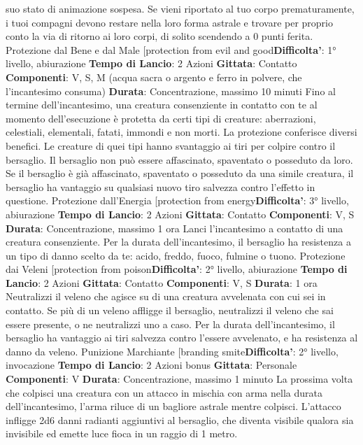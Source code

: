 \begin{multicols}{2}
suo stato di animazione sospesa.
Se vieni riportato al tuo corpo prematuramente, i tuoi
compagni devono restare nella loro forma astrale e
trovare per proprio conto la via di ritorno ai loro corpi, di
solito scendendo a 0 punti ferita.
Protezione dal Bene e dal Male
[protection from evil and good\textbf{Difficolta'}:
1° livello, abiurazione
\textbf{Tempo di Lancio}: 2 Azioni
\textbf{Gittata}: Contatto
\textbf{Componenti}: V, S, M (acqua sacra o argento e ferro in
polvere, che l’incantesimo consuma)
\textbf{Durata}: Concentrazione, massimo 10 minuti
Fino al termine dell’incantesimo, una creatura
consenziente in contatto con te al momento
dell’esecuzione è protetta da certi tipi di creature:
aberrazioni, celestiali, elementali, fatati, immondi e non
morti.
La protezione conferisce diversi benefici. Le creature di
quei tipi hanno svantaggio ai tiri per colpire contro il
bersaglio. Il bersaglio non può essere affascinato,
spaventato o posseduto da loro. Se il bersaglio è già
affascinato, spaventato o posseduto da una simile
creatura, il bersaglio ha vantaggio su qualsiasi nuovo
tiro salvezza contro l’effetto in questione.
Protezione dall’Energia
[protection from energy\textbf{Difficolta'}:
3° livello, abiurazione
\textbf{Tempo di Lancio}: 2 Azioni
\textbf{Gittata}: Contatto
\textbf{Componenti}: V, S
\textbf{Durata}: Concentrazione, massimo 1 ora
Lanci l’incantesimo a contatto di una creatura
consenziente. Per la durata dell’incantesimo, il
bersaglio ha resistenza a un tipo di danno scelto da te:
acido, freddo, fuoco, fulmine o tuono.
Protezione dai Veleni
[protection from poison\textbf{Difficolta'}:
2° livello, abiurazione
\textbf{Tempo di Lancio}: 2 Azioni
\textbf{Gittata}: Contatto
\textbf{Componenti}: V, S
\textbf{Durata}: 1 ora
Neutralizzi il veleno che agisce su di una creatura
avvelenata con cui sei in contatto. Se più di un veleno
affligge il bersaglio, neutralizzi il veleno che sai essere
presente, o ne neutralizzi uno a caso.
Per la durata dell’incantesimo, il bersaglio ha vantaggio
ai tiri salvezza contro l’essere avvelenato, e ha
resistenza al danno da veleno.
Punizione Marchiante
[branding smite\textbf{Difficolta'}:
2° livello, invocazione
\textbf{Tempo di Lancio}: 2 Azioni bonus
\textbf{Gittata}: Personale
\textbf{Componenti}: V
\textbf{Durata}: Concentrazione, massimo 1 minuto
La prossima volta che colpisci una creatura con un
attacco in mischia con arma nella durata
dell’incantesimo, l’arma riluce di un bagliore astrale
mentre colpisci. L’attacco infligge 2d6 danni radianti
aggiuntivi al bersaglio, che diventa visibile qualora sia
invisibile ed emette luce fioca in un raggio di 1 metro.

\end{multicols}
